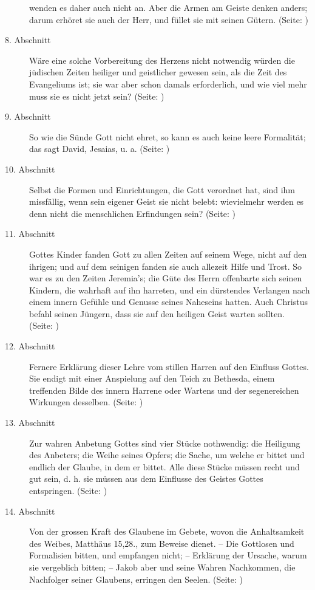 \begin{description}
wenden es daher auch nicht an. Aber die Armen am Geiste denken anders; darum
erhöret sie auch der Herr, und füllet sie mit seinen Gütern. (Seite:
\pageref{kap6_ab7})
\item[8. Abschnitt] Wäre eine solche
Vorbereitung des Herzens nicht notwendig würden die jüdischen Zeiten heiliger
und geistlicher gewesen sein, als die Zeit des Evangeliums ist; sie war aber
schon damals erforderlich, und wie viel mehr muss sie es nicht jetzt sein?
(Seite: \pageref{kap6_ab8})
\item[9. Abschnitt] So wie die Sünde Gott nicht ehret, so kann es auch keine
leere Formalität; das sagt David, Jesaias, u. a. (Seite: \pageref{kap6_ab9})
\item[10. Abschnitt] Selbst die Formen und Einrichtungen, die Gott verordnet
hat, sind ihm missfällig, wenn sein eigener Geist sie nicht belebt: wievielmehr
werden es denn nicht die menschlichen Erfindungen sein? (Seite:
\pageref{kap6_ab10})
\item[11. Abschnitt] Gottes Kinder fanden Gott zu allen Zeiten auf seinem Wege,
nicht auf den ihrigen; und auf dem seinigen fanden sie auch allezeit Hilfe und
Trost. So war es zu den Zeiten Jeremia's; die Güte des Herrn offenbarte sich
seinen Kindern, die wahrhaft auf ihn harreten, und ein dürstendes Verlangen nach
einem innern Gefühle und Genusse seines Naheseins hatten. Auch Christus befahl
seinen Jüngern, dass sie auf den heiligen Geist warten sollten. (Seite:
\pageref{kap6_ab11})
\item[12. Abschnitt] Fernere Erklärung dieser Lehre vom stillen Harren auf den
Einfluss Gottes. Sie endigt mit einer Anspielung auf den Teich zu Bethesda,
einem treffenden Bilde des innern Harrene oder Wartens und der segenereichen
Wirkungen desselben. (Seite: \pageref{kap6_ab12})
\item[13. Abschnitt] Zur wahren Anbetung Gottes sind vier Stücke nothwendig: die
Heiligung des Anbeters; die Weihe seines Opfers; die Sache, um welche er bittet
und endlich der Glaube, in dem er bittet. Alle diese Stücke müssen recht und gut
sein, d. h. sie müssen aus dem Einflusse des Geistes Gottes entspringen. (Seite:
\pageref{kap6_ab13})
\item[14. Abschnitt] Von der grossen Kraft des Glaubene im Gebete, wovon die
Anhaltsamkeit des Weibes, Matthäus 15,28., zum Beweise dienet. -- Die Gottlosen
und Formalisien bitten, und empfangen nicht; -- Erklärung der Ursache, warum sie
vergeblich bitten; -- Jakob aber und seine Wahren Nachkommen, die Nachfolger
seiner Glaubens, erringen
den Seelen. (Seite: \pageref{kap6_ab14})

\end{description}
